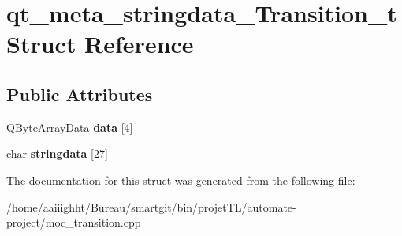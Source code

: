 \hypertarget{structqt__meta__stringdata___transition__t}{\section{qt\-\_\-meta\-\_\-stringdata\-\_\-\-Transition\-\_\-t Struct Reference}
\label{structqt__meta__stringdata___transition__t}
}
\subsection*{Public Attributes}
\begin{DoxyCompactItemize}
\item 
\hypertarget{structqt__meta__stringdata___transition__t_a225b29f85eefacb8e10cfc21bdadc9c0}{Q\-Byte\-Array\-Data {\bfseries data} \mbox{[}4\mbox{]}}\label{structqt__meta__stringdata___transition__t_a225b29f85eefacb8e10cfc21bdadc9c0}

\item 
\hypertarget{structqt__meta__stringdata___transition__t_aead2c1958dd4a7dfd68b26587684a648}{char {\bfseries stringdata} \mbox{[}27\mbox{]}}\label{structqt__meta__stringdata___transition__t_aead2c1958dd4a7dfd68b26587684a648}

\end{DoxyCompactItemize}


The documentation for this struct was generated from the following file\-:\begin{DoxyCompactItemize}
\item 
/home/aaiiighht/\-Bureau/smartgit/bin/projet\-T\-L/automate-\/project/moc\-\_\-transition.\-cpp\end{DoxyCompactItemize}
